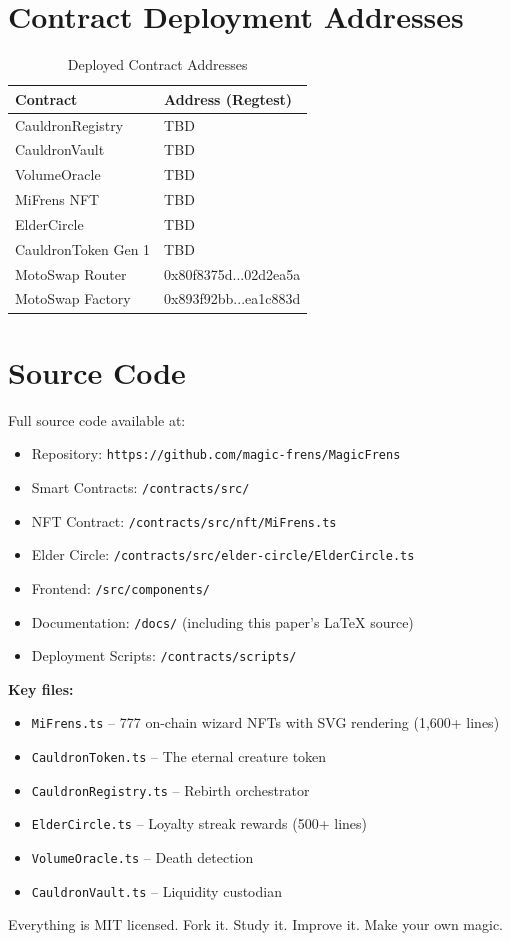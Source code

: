 \documentclass[11pt,a4paper]{article}
\begin{document}
\appendix

\section{Contract Deployment Addresses}

\begin{table}[h]
\centering
\begin{tabular}{|l|l|}
\hline
\textbf{Contract} & \textbf{Address (Regtest)} \\
\hline
CauldronRegistry & TBD \\
CauldronVault & TBD \\
VolumeOracle & TBD \\
MiFrens NFT & TBD \\
ElderCircle & TBD \\
CauldronToken Gen 1 & TBD \\
MotoSwap Router & 0x80f8375d...02d2ea5a \\
MotoSwap Factory & 0x893f92bb...ea1c883d \\
\hline
\end{tabular}
\caption{Deployed Contract Addresses}
\end{table}

\section{Source Code}

Full source code available at:
\begin{itemize}
    \item Repository: \texttt{https://github.com/magic-frens/MagicFrens}
    \item Smart Contracts: \texttt{/contracts/src/}
    \item NFT Contract: \texttt{/contracts/src/nft/MiFrens.ts}
    \item Elder Circle: \texttt{/contracts/src/elder-circle/ElderCircle.ts}
    \item Frontend: \texttt{/src/components/}
    \item Documentation: \texttt{/docs/} (including this paper's LaTeX source)
    \item Deployment Scripts: \texttt{/contracts/scripts/}
\end{itemize}

\textbf{Key files:}
\begin{itemize}
    \item \texttt{MiFrens.ts} -- 777 on-chain wizard NFTs with SVG rendering (1,600+ lines)
    \item \texttt{CauldronToken.ts} -- The eternal creature token
    \item \texttt{CauldronRegistry.ts} -- Rebirth orchestrator
    \item \texttt{ElderCircle.ts} -- Loyalty streak rewards (500+ lines)
    \item \texttt{VolumeOracle.ts} -- Death detection
    \item \texttt{CauldronVault.ts} -- Liquidity custodian
\end{itemize}

Everything is MIT licensed. Fork it. Study it. Improve it. Make your own magic.
\end{document}
